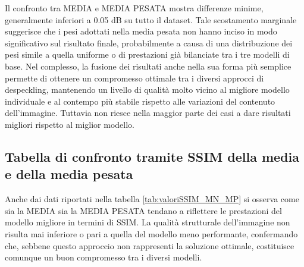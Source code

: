 Il confronto tra MEDIA e MEDIA PESATA mostra differenze minime, generalmente inferiori a 0.05 dB su tutto il dataset. Tale scostamento 
marginale suggerisce che i pesi adottati nella media pesata non hanno inciso in modo significativo sul risultato finale, probabilmente a 
causa di una distribuzione dei pesi simile a quella uniforme o di prestazioni già bilanciate tra i tre modelli di base.
Nel complesso, la fusione dei risultati anche nella sua forma più semplice permette di ottenere un compromesso ottimale tra i diversi 
approcci di despeckling, mantenendo un livello di qualità molto vicino al migliore modello individuale e al contempo più 
stabile rispetto alle variazioni del contenuto dell’immagine. Tuttavia non riesce nella maggior parte dei casi a dare 
risultati migliori rispetto al miglior modello.

\subsection{Tabella di confronto tramite SSIM della media e della media pesata}
\begin{table}[H] %
    \centering
    \caption{Confronto dei modelli di despeckling e della loro fusione. 
              I valori sopra, indicano la media del SSIM di 100 immagini rappresentanti diversi biomi.
              Ogni modello per la previsione della qualità, usato in MEDIA PESATA, 
              è stato allenato per 10 epoche con un dataset da 30'000 
              immagini. }
    \label{tab:valoriSSIM_MN_MP}
  \end{table}  
  Anche dai dati riportati nella tabella \ref{tab:valoriSSIM_MN_MP} si osserva come sia la MEDIA sia la MEDIA PESATA 
  tendano a riflettere le prestazioni del modello migliore in termini di SSIM. La qualità strutturale dell’immagine 
  non risulta mai inferiore o pari a quella del modello meno performante, confermando che, sebbene questo 
  approccio non rappresenti la soluzione ottimale, costituisce comunque un buon compromesso tra i diversi modelli.
